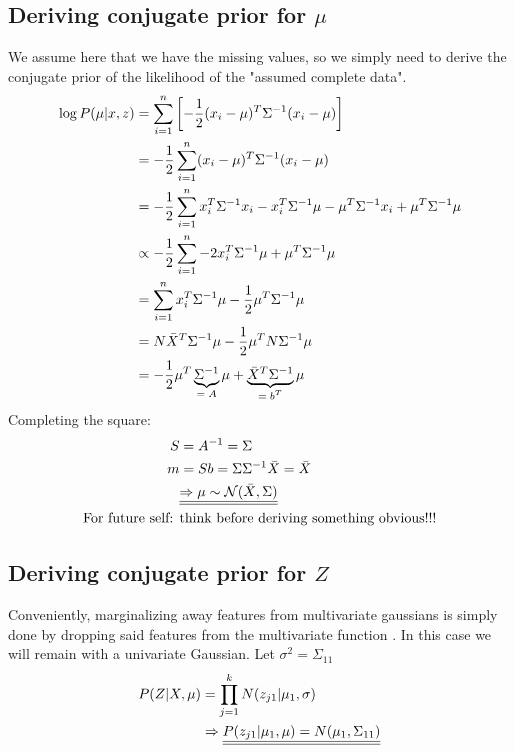 \documentclass[12pt]{article}
\begin{document}
    \subsection{Deriving conjugate prior for \texorpdfstring{$\mu$}{}}
        We assume here that we have the missing values, so we simply need to derive the conjugate prior 
        of the likelihood of the "assumed complete data". 
        \begin{align*}
            \log P(\mu|x,z) &= \sumlim{1}{n} \enclb{-\frac{1}{2}(x_i-\mu)^T \Sigma^{-1} (x_i-\mu)} \\ 
            &=-\frac{1}{2}\sumlim{1}{n} (x_i-\mu)^T \Sigma^{-1} (x_i-\mu) \\
            &=-\frac{1}{2}\sumlim{1}{n} x_i^T\Sigma^{-1}x_i - x_i^T\Sigma^{-1}\mu - \mu^T\Sigma^{-1}x_i +   \mu^T\Sigma^{-1}\mu\\
            &\propto -\frac{1}{2}\sumlim{1}{n} - 2x_i^T\Sigma^{-1}\mu + \mu^T\Sigma^{-1}\mu\\
            &= \sumlim{1}{n} x_i^T\Sigma^{-1}\mu - \frac{1}{2}\mu^T\Sigma^{-1}\mu\\
            &=  N\bar{X}^T\Sigma^{-1}\mu - \frac{1}{2}\mu^TN\Sigma^{-1}\mu\\
            &=  - \frac{1}{2}\mu^T\undertext{\Sigma^{-1}}{$=A$}\mu + \undertext{\bar{X}^T\Sigma^{-1}}{$=b^T$}\mu 
        \end{align*}
        Completing the square:
        \begin{align*}
            S &= A^{-1} = \Sigma \\ 
            m &= Sb = \Sigma \Sigma^{-1} \bar{X} = \bar{X}\\
            &\dunderline{\Rightarrow \mu \sim \mathcal{N}(\bar{X},\Sigma)} \\ 
            \text{For future self: }&\text{think before deriving something obvious!!!}
        \end{align*}
    
    \subsection{Deriving conjugate prior for \texorpdfstring{$Z$}{}}
        Conveniently, marginalizing away features from multivariate gaussians is simply done by dropping said features from the multivariate function \cite{marginalmvn}. In this case we will remain with a univariate Gaussian. Let $\sigma^2 = \Sigma_{11}$
        \begin{align*}
            P(Z|X,\mu) &= \prodlim[j]{1}{k} N(z_{j1}|\mu_1, \sigma)\\
            &\Rightarrow \dunderline{P(z_{j1}|\mu_1,\mu) = N(\mu_1,\Sigma_{11})}
        \end{align*}
    
\end{document}
